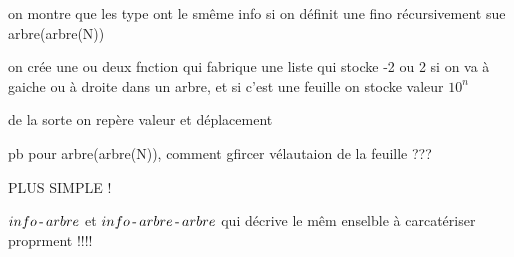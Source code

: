 on montre que les type ont le smême info si on définit une fino récursivement sue arbre(arbre(N)) 


on crée une ou deux fnction qui fabrique une liste qui stocke -2 ou 2 si on va à gaiche ou à droite dans un arbre, et  si c'est une feuille on stocke valeur $10^n$ 

de la sorte on repère valeur et déplacement


pb pour arbre(arbre(N)), comment gfircer vélautaion de la feuille ???



\Huge

PLUS SIMPLE !

$info\,\text{-}\,arbre$ et $info\,\text{-}\,arbre\,\text{-}\,arbre$ qui décrive le mêm enselble à carcatériser proprment !!!!
